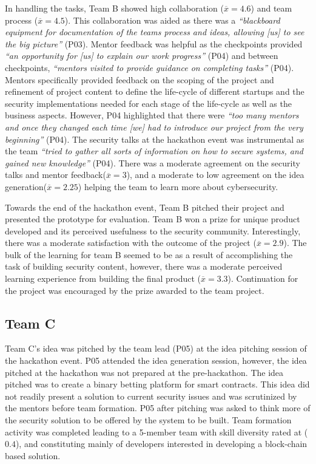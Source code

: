 \documentclass[runningheads]{llncs}
\begin{document}
In handling the tasks, Team B showed high collaboration ($\overline{x} = 4.6$) and team process ($\overline{x} = 4.5$). This collaboration was aided as there was a \textit{``blackboard equipment for documentation of the teams process and ideas, allowing [us] to see the big picture''} (P03). Mentor feedback was helpful as the checkpoints provided \textit{``an opportunity for [us] to explain our work progress''} (P04) and between checkpoints, \textit{``mentors visited to provide guidance on completing tasks''} (P04). Mentors specifically provided feedback on the scoping of the project and refinement of project content to define the life-cycle of different startups and the security implementations needed for each stage of the life-cycle as well as the business aspects. However, P04 highlighted that there were \textit{``too many mentors and once they changed each time [we] had to introduce our project from the very beginning''} (P04). The security talks at the hackathon event was instrumental as the team \textit{``tried to gather all sorts of information on how to secure systems, and gained new knowledge''} (P04). There was a moderate agreement on the security talks and mentor feedback($\overline{x} = 3$), and a moderate to low agreement on the idea generation($\overline{x} = 2.25$) helping the team to learn more about cybersecurity. 

Towards the end of the hackathon event, Team B pitched their project and presented the prototype for evaluation. Team B won a prize for unique product developed and its perceived usefulness to the security community. Interestingly, there was a moderate satisfaction with the outcome of the project ($\overline{x} = 2.9$). The bulk of the learning for team B seemed to be as a result of accomplishing the task of building security content, however, there was a moderate perceived learning experience from building the final product ($\overline{x} = 3.3$). Continuation for the project was encouraged by the prize awarded to the team project.


\subsection{Team C}
Team C's idea was pitched by the team lead (P05) at the idea pitching session of the hackathon event. P05 attended the idea generation session, however, the idea pitched at the hackathon was not prepared at the pre-hackathon. The idea pitched was to create a binary betting platform for smart contracts. This idea did not readily present a solution to  current security issues and was scrutinized by the mentors before team formation. P05 after pitching was asked to think more of the security solution to be offered by the system to be built. Team formation activity was completed leading to a 5-member team with skill diversity rated at ($\textit{0.4}$), and constituting mainly of developers interested in developing a block-chain based solution.
\end{document}
